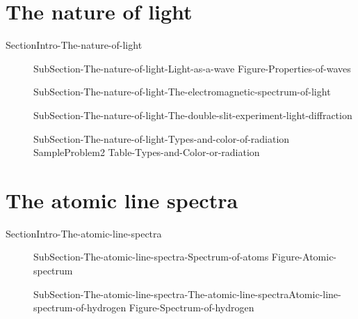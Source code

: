 \documentclass[main.tex]{subfiles}
\newcommand\chapterlabel{Ch-Table}\setcounter{figurenewcounter}{0}\setcounter{tablenewcounter}{0}\setcounter{formulanewcounter}{0}\chapterpicture{../{\chapterlabel}/figure1}\chapterpicturelabel{PxFuel}
\begin{document}
{{\section{The nature of light}{SectionIntro-The-nature-of-light}
\vspace{0cm}\hspace{-5cm}{Figure-waves-and-life}
\sloppy\begin{description}
\item[]{SubSection-The-nature-of-light-Light-as-a-wave}
{Figure-Properties-of-waves}
\item[]{SubSection-The-nature-of-light-The-electromagnetic-spectrum-of-light}
\vspace{-1cm}{Figure-Electromagnetic-field}
\item[] {SubSection-The-nature-of-light-The-double-slit-experiment-light-diffraction}
\vspace{-1cm}{Figure-Double-slit}
\vspace{1cm}{Figure-Electromagnetic-spectra}
\item[] {SubSection-The-nature-of-light-Types-and-color-of-radiation}
{SampleProblem2}
{Table-Types-and-Color-or-radiation}
\end{description}
 

 \section{The atomic line spectra}
{SectionIntro-The-atomic-line-spectra}
\sloppy\begin{description}
\item[]{SubSection-The-atomic-line-spectra-Spectrum-of-atoms}
{Figure-Atomic-spectrum}
\item[]{SubSection-The-atomic-line-spectra-The-atomic-line-spectraAtomic-line-spectrum-of-hydrogen}
{Figure-Spectrum-of-hydrogen}
\end{description}

}}
\end{document}
